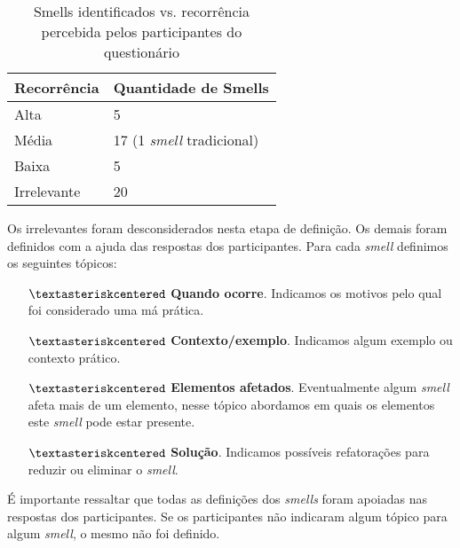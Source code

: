 \begin{table}[h]
\centering
\caption{Smells identificados vs. recorr\^encia percebida pelos participantes do question\'ario}
\begin{tabular}{p{3cm}|p{4cm}}
\textbf{Recorr\^encia} & \textbf{Quantidade de Smells} \\
\hline
Alta  			& 5 \\
M\'edia 		& 17 (1 \textit{smell} tradicional) \\
Baixa			& 5 \\
Irrelevante 	& 20 \\
\end{tabular}
\label{tab:DadosDemograficos}
\end{table}

Os irrelevantes foram desconsiderados nesta etapa de defini\c{c}\~ao. Os demais foram definidos com a ajuda das respostas dos participantes. Para cada \textit{smell} definimos os seguintes t\'opicos: 

\begin{itemize} 
	\item[$\textasteriskcentered$] \textbf{Quando ocorre}. Indicamos os motivos pelo qual foi considerado uma m\'a pr\'atica.   
	\item[$\textasteriskcentered$] \textbf{Contexto/exemplo}. Indicamos algum exemplo ou contexto pr\'atico. 
	\item[$\textasteriskcentered$] \textbf{Elementos afetados}. Eventualmente algum \textit{smell} afeta mais de um elemento, nesse t\'opico abordamos em quais os elementos este \textit{smell} pode estar presente. 
	\item[$\textasteriskcentered$] \textbf{Solu\c{c}\~ao}. Indicamos poss\'iveis refatora\c{c}\~oes para reduzir ou eliminar o \textit{smell}. \\
\end{itemize}

\'E importante ressaltar que todas as defini\c{c}\~oes dos \textit{smells} foram apoiadas nas respostas dos participantes. Se os participantes n\~ao indicaram algum t\'opico para algum \textit{smell}, o mesmo n\~ao foi definido. \\

